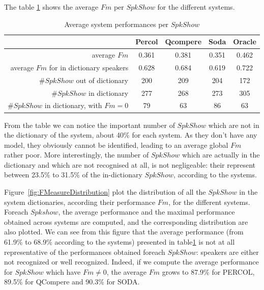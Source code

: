 

The table \ref{table-spkshow-perf} shows the average $Fm$ per $SpkShow$ for the different systems.
\begin{table}[t]
\begin{center}
\begin{tabular}{r||c|c|c|c}
& Percol & Qcompere & Soda & Oracle \\\hline\hline
average $Fm$ & 0.361 & 0.381 & 0.351 & 0.462\\\hline
average $Fm$ for in dictionary speakers & 0.628 & 0.684 & 0.619 & 0.722\\\hline
\#$SpkShow$ out of dictionary & 200 & 209 & 204 & 172\\\hline
\#$SpkShow$ in dictionary & 277& 268 & 273 & 305\\\hline
\#$SpkShow$ in dictionary, with $Fm=0$ & 79 & 63 & 86 & 63\\\hline
\end{tabular}
\caption{Average system performances per $SpkShow$}
\label{table-spkshow-perf}
\end{center}
\end{table}

From the table we can notice the important number of $SpkShow$ which are not in the dictionary of the system, about 40\% for each system. As they don't have any model, they obviously cannot be identified, leading to an average global $Fm$ rather poor. More interestingly, the number of $SpkShow$ which are actually in the dictionary and which are not recognised at all, is not negligeable: their represent between 23.5\% to 31.5\% of the in-dictionary $SpkShow$, according to the systems.


Figure~\ref{fig:FMeasureDistribution} plot the distribution of all the $SpkShow$ in the system dictionaries, according their performance $Fm$, for the different systems. Foreach $Spkshow$, the average performance and the maximal performance obtained across systems are computed, and the corresponding distribution are also plotted. We can see from this figure that the average performance (from 61.9\% to 68.9\% according to the systems) presented in table\ref{table-spkshow-perf} is not at all representative of the performances obtained foreach $SpkShow$: speakers are either not recognized or well recognized. Indeed, if we compute the average performance for $SpkShow$ which have $Fm \neq 0$, the average $Fm$ grows to 87.9\% for PERCOL, 89.5\% for QCompere and 90.3\% for SODA. 


